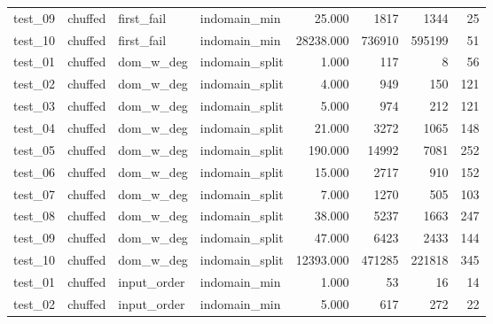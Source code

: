 \begin{longtable}{l l l l r r r r}
    test\_09         & chuffed         & first\_fail       & indomain\_min     & 25.000             & 1817           & 1344              & 25             \\
    test\_10         & chuffed         & first\_fail       & indomain\_min     & 28238.000          & 736910         & 595199            & 51             \\
    \midrule
    test\_01         & chuffed         & dom\_w\_deg       & indomain\_split   & 1.000              & 117            & 8                 & 56             \\
    test\_02         & chuffed         & dom\_w\_deg       & indomain\_split   & 4.000              & 949            & 150               & 121            \\
    test\_03         & chuffed         & dom\_w\_deg       & indomain\_split   & 5.000              & 974            & 212               & 121            \\
    test\_04         & chuffed         & dom\_w\_deg       & indomain\_split   & 21.000             & 3272           & 1065              & 148            \\
    test\_05         & chuffed         & dom\_w\_deg       & indomain\_split   & 190.000            & 14992          & 7081              & 252            \\
    test\_06         & chuffed         & dom\_w\_deg       & indomain\_split   & 15.000             & 2717           & 910               & 152            \\
    test\_07         & chuffed         & dom\_w\_deg       & indomain\_split   & 7.000              & 1270           & 505               & 103            \\
    test\_08         & chuffed         & dom\_w\_deg       & indomain\_split   & 38.000             & 5237           & 1663              & 247            \\
    test\_09         & chuffed         & dom\_w\_deg       & indomain\_split   & 47.000             & 6423           & 2433              & 144            \\
    test\_10         & chuffed         & dom\_w\_deg       & indomain\_split   & 12393.000          & 471285         & 221818            & 345            \\
    \midrule
    test\_01         & chuffed         & input\_order      & indomain\_min     & 1.000              & 53             & 16                & 14             \\
    test\_02         & chuffed         & input\_order      & indomain\_min     & 5.000              & 617            & 272               & 22             \\

\end{longtable}
